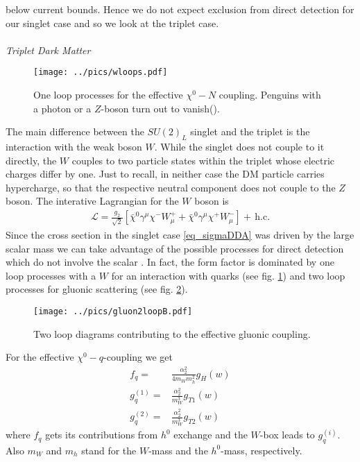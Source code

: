 below current bounds. Hence we do not expect exclusion from direct detection for our singlet case and so we look at the triplet case.
\\ \\ \textit{Triplet Dark Matter}\\
\begin{figure}[t]
 \texttt{[image: ../pics/wloops.pdf]}
 \caption{One loop processes for the effective $\chi^0-N$ coupling. Penguins with a photon or a $Z$-boson turn out to vanish(\cite{1104.0228}).}
 \label{pic_wloop}
\end{figure}
The main difference between the $SU(2)_L$ singlet and the triplet is the interaction with the weak boson $W$. While the singlet does not couple to
it directly, the $W$ couples to two particle states within the triplet whose electric charges differ by one. Just to recall, in neither case the 
DM particle carries hypercharge, so that the respective neutral component does not couple to the $Z$ boson. The interative Lagrangian for the $W$ 
boson is 
\begin{align}
 \mathcal{L} = \frac{g_2}{\sqrt{2}} \left[\bar \chi^0 \gamma^\mu \chi^- W^+_\mu + \bar \chi^0 \gamma^\mu \chi^+W^-_\mu\right] +\, \text{h.c.}
\end{align}
Since the cross section in the singlet case \eqref{eq_sigmaDDA} was driven by the large scalar mass we can take advantage of the possible processes
for direct detection which do not involve the scalar \cite{1004.4090}. In fact, the form factor is dominated by one loop processes with a $W$ for an interaction with
quarks (see fig. \ref{pic_wloop}) and two loop processes for gluonic scattering (see fig. \ref{pic_2loopgluon}).
\begin{figure}[t]
 \texttt{[image: ../pics/gluon2loopB.pdf]}
 \caption{Two loop diagrams contributing to the effective gluonic coupling.}
 \label{pic_2loopgluon}
\end{figure}
For the effective $\chi^0-q$-coupling we get
\begin{align}
 f_q =& \frac{\alpha_2^2}{4m_W m_{h}^2} g_H(w)\\
 g^{(1)}_q =& \frac{\alpha_2^2}{m_W^3}g_{T1}(w)\\
 g^{(2)}_q =&\frac{\alpha_2^2}{m_W^3}g_{T2}(w) 
\end{align}
where $f_q$ gets its contributions from $h^0$ exchange and the $W$-box leads to $g^{(i)}_q$. Also $m_W$ and $m_h$ stand for the $W$-mass and the 
$h^0$-mass, respectively.\\
